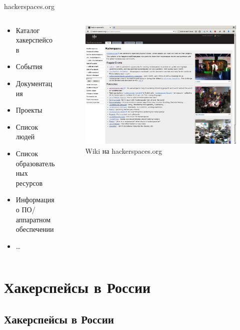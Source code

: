 \documentclass[presentation]{beamer}
\begin{document}
\label{sec-1-3}
\begin{frame}[label=sec-1-3-3]{hackerspaces.org}
  \begin{columns}
    \begin{column}{0.4\textwidth}
      \begin{itemize}
      \item Каталог хакерспейсов
      \item События
      \item Документация
      \item Проекты
      \item Список людей
      \item Список образовательных ресурсов
      \item Информация о ПО/аппаратном обеспечении
      \item \ldots
      \end{itemize}
    \end{column}
    \begin{column}{0.6\textwidth}
    \begin{figure}[htb]
      \centering
      \includegraphics[width=.9\linewidth]{hackerspaces-org}
      \caption{\label{hackerspaces-org}Wiki на hackerspaces.org}
    \end{figure}
    \end{column}
  \end{columns}
\end{frame}

\section{Хакерспейсы в России}
\subsection{Хакерспейсы в России}
\end{document}
